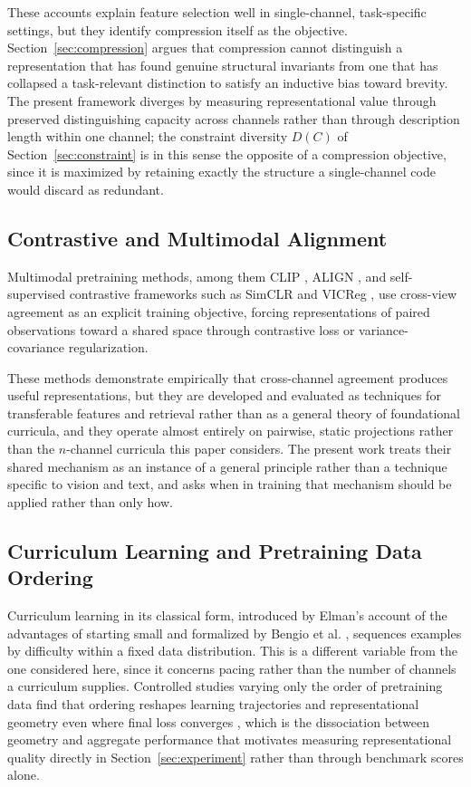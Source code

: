 \documentclass[11pt]{article}
\begin{document}
These accounts explain feature selection well in single-channel, task-specific settings, but they identify compression itself as the objective. Section~\ref{sec:compression} argues that compression cannot distinguish a representation that has found genuine structural invariants from one that has collapsed a task-relevant distinction to satisfy an inductive bias toward brevity. The present framework diverges by measuring representational value through preserved distinguishing capacity across channels rather than through description length within one channel; the constraint diversity $D(C)$ of Section~\ref{sec:constraint} is in this sense the opposite of a compression objective, since it is maximized by retaining exactly the structure a single-channel code would discard as redundant.

\subsection{Contrastive and Multimodal Alignment}
\label{sec:rel-contrastive}

Multimodal pretraining methods, among them CLIP \cite{radford2021learning}, ALIGN \cite{jia2021scaling}, and self-supervised contrastive frameworks such as SimCLR \cite{chen2020simple} and VICReg \cite{bardes2021vicreg}, use cross-view agreement as an explicit training objective, forcing representations of paired observations toward a shared space through contrastive loss or variance-covariance regularization.

These methods demonstrate empirically that cross-channel agreement produces useful representations, but they are developed and evaluated as techniques for transferable features and retrieval rather than as a general theory of foundational curricula, and they operate almost entirely on pairwise, static projections rather than the $n$-channel curricula this paper considers. The present work treats their shared mechanism as an instance of a general principle rather than a technique specific to vision and text, and asks when in training that mechanism should be applied rather than only how.

\subsection{Curriculum Learning and Pretraining Data Ordering}
\label{sec:rel-curriculum}

Curriculum learning in its classical form, introduced by Elman's account of the advantages of starting small \cite{elman1993starting} and formalized by Bengio et al. \cite{bengio2009curriculum}, sequences examples by difficulty within a fixed data distribution. This is a different variable from the one considered here, since it concerns pacing rather than the number of channels a curriculum supplies. Controlled studies varying only the order of pretraining data find that ordering reshapes learning trajectories and representational geometry even where final loss converges \cite{dini2026impact}, which is the dissociation between geometry and aggregate performance that motivates measuring representational quality directly in Section~\ref{sec:experiment} rather than through benchmark scores alone.
\end{document}
